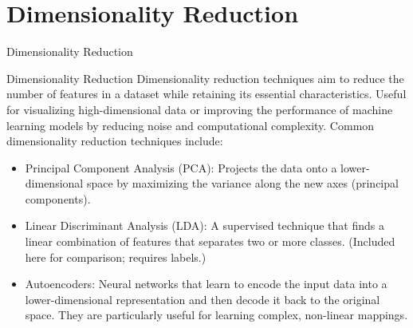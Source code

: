 \documentclass[hyperref={pdfpagelabels=false},aspectratio=169]{beamer}
\begin{document}
\section{Dimensionality Reduction}
\label{sec:org8b93320}
\begin{frame}[label={sec:org3e990a7}]{Dimensionality Reduction}
\begin{block}{Dimensionality Reduction}
\pause
\alert{Dimensionality reduction} techniques aim to reduce the number of features in a dataset while retaining its essential characteristics. Useful for visualizing high-dimensional data or improving the performance of machine learning models by reducing noise and computational complexity. Common dimensionality reduction techniques include:
\begin{itemize}[<+->]
\item \alert{Principal Component Analysis (PCA)}: Projects the data onto a lower-dimensional space by maximizing the variance along the new axes (principal components).
\item \alert{Linear Discriminant Analysis (LDA)}: A supervised technique that finds a linear combination of features that separates two or more classes. (Included here for comparison; requires labels.)
\item \alert{Autoencoders}: Neural networks that learn to encode the input data into a lower-dimensional representation and then decode it back to the original space. They are particularly useful for learning complex, non-linear mappings.
\end{itemize}
\end{block}
\end{frame}
\end{document}
